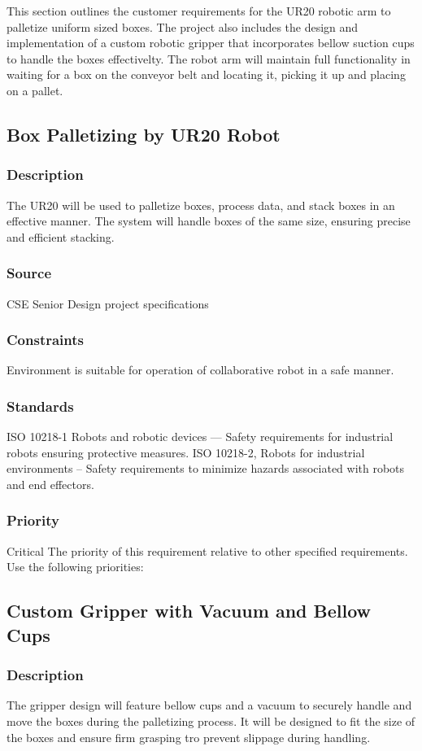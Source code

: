 This section outlines the customer requirements for the UR20 robotic arm to palletize uniform sized boxes. The project also includes the design and implementation of a custom robotic gripper that incorporates bellow suction cups to handle the boxes effectivelty. The robot arm will maintain full functionality in waiting for a box on the conveyor belt and locating it, picking it up and placing on a pallet. 
\subsection{Box Palletizing by UR20 Robot}
\subsubsection{Description}
The UR20 will be used to palletize boxes, process data, and stack boxes in an effective manner. The system will handle boxes of the same size, ensuring precise and efficient stacking.
\subsubsection{Source}
 CSE Senior Design project specifications
\subsubsection{Constraints}
Environment is suitable for operation of collaborative robot in a safe manner. 
\subsubsection{Standards}
ISO 10218-1 Robots and robotic devices — Safety requirements for industrial robots ensuring protective measures.
ISO 10218-2, Robots for industrial environments – Safety requirements to minimize hazards associated with robots and end effectors.
\subsubsection{Priority}
Critical
The priority of this requirement relative to other specified requirements. Use the following priorities:

\subsection{Custom Gripper with Vacuum and Bellow Cups}
\subsubsection{Description}
The gripper design will feature bellow cups and a vacuum to securely handle and move the boxes during the palletizing process. It will be designed to fit the size of the boxes and ensure firm grasping tro prevent slippage during handling.
